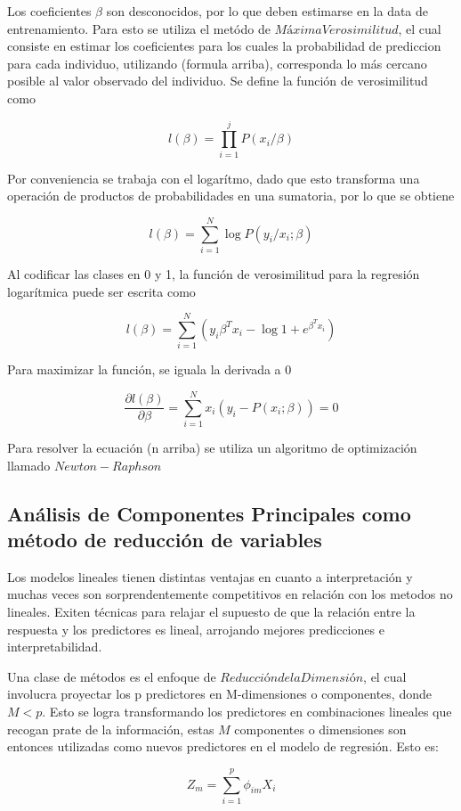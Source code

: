 \documentclass[a4paper,12pt]{Latex/Classes/PhDthesisPSnPDF}
\begin{document}
Los coeficientes $\beta$ son desconocidos, por lo que deben estimarse en la data de entrenamiento. Para esto se utiliza el metódo de $Máxima Verosimilitud$, el cual consiste en estimar los coeficientes para los cuales la probabilidad de prediccion para cada individuo, utilizando (formula arriba), corresponda lo más cercano posible al valor observado del individuo. Se define la función de verosimilitud como

$$ l(\beta) = \prod_{i=1}^{j}{P(x_{i} / \beta)} $$
  
Por conveniencia se  trabaja con el logarítmo, dado que esto transforma una operación de productos de probabilidades en una sumatoria, por lo que se obtiene

$$ l(\beta) = \sum_{i=1}^{N} \log{P(y_{i}/ x_{i}; \beta)} $$

Al codificar las clases en 0 y 1, la función de verosimilitud para la regresión logarítmica puede ser escrita como

$$ l(\beta) = \sum_{i=1}^{N}(y_{i}\beta^{T}x_{i} - \log{1 + e^{\beta^{T}x_{i}}}) $$

Para maximizar la función, se iguala la derivada a 0

$$ \frac{\partial l(\beta)}{\partial \beta} = \sum_{i=1}^{N}x_{i}(y_{i} - P(x_{i}; \beta)) = 0 $$

Para resolver la ecuación (n arriba) se utiliza un algoritmo de optimización llamado $Newton-Raphson$

\subsection{Análisis de Componentes Principales como método de reducción de variables}

Los modelos lineales tienen distintas ventajas en cuanto a interpretación y muchas veces son sorprendentemente competitivos en relación con los metodos no lineales. Exiten técnicas para relajar el supuesto de  que la relación entre la respuesta y los predictores es lineal, arrojando mejores predicciones e interpretabilidad. 

Una clase de métodos es el enfoque de $Reducción de la Dimensión$, el cual involucra proyectar los p predictores en M-dimensiones o componentes, donde $M < p$. Esto se logra transformando los predictores en combinaciones lineales que recogan prate de la información, estas $M$ componentes o dimensiones son entonces utilizadas como nuevos predictores en el modelo de regresión. Esto es:

$$ Z_{m} = \sum_{i = 1}^{p} \phi_{im}X_{i} $$
\end{document}
